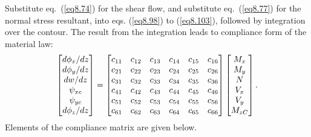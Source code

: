 \documentclass{AeroStructure-ERJohnson}
\begin{document}
Substitute eq.~(\ref{eq8.74}) for the shear flow, and substitute
eq.~(\ref{eq8.77}) for the normal stress resultant, into eqs.
(\ref{eq8.98}) to (\ref{eq8.103}), followed by integration over
the contour. The result from the integration leads to compliance
form of the material law:\vspace*{-9pt}\enlargethispage{1\baselineskip}
\begin{align}\label{eq8.104}
\left[\begin{array}{@{}c@{}}d \phi_{x}/ d z\\
d \phi_{y}/ d z\\
d w/ d z\\
\psi_{x c}\\
\psi_{y c}\\
d \phi_{z}/ d
z\end{array}\right]=\left[\begin{array}{@{}llllll@{}}c_{11} &
c_{12} & c_{13} & c_{14} & c_{15} & c_{16}\\
c_{21} & c_{22} &
c_{23} & c_{24} & c_{25} & c_{26}\\
c_{31} & c_{32} & c_{33} &
c_{34} & c_{35} & c_{36}\\
c_{41} & c_{42} & c_{43} & c_{44} &
c_{45} & c_{46}\\
c_{51} & c_{52} & c_{53} & c_{54} & c_{55} &
c_{56}\\
c_{61} & c_{62} & c_{63} & c_{64} & c_{65} &
c_{66}\end{array}\right]\left[\begin{array}{@{}c@{}}M_{x}\\
M_{y}\\
N\\
V_{x}\\
V_{y}\\
M_{z C}\end{array}\right].
\end{align}
Elements of the compliance matrix are given below.\vspace*{-3pt}
\end{document}
